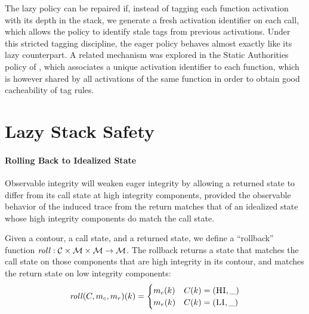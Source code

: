 \documentclass[acmsmall,review,anonymous]{acmart}\settopmatter{printfolios=true,printccs=false,printacmref=false}
\begin{document}
The lazy policy can be repaired if, instead of tagging each function activation
with its depth in the stack, we generate a fresh activation identifier on each
call, which allows the policy to identify stale tags from previous activations.
Under this stricted tagging discipline, the eager policy behaves almost exactly
like its lazy counterpart. A related mechanism was explored in the Static
Authorities policy of \citet{DBLP:conf/sp/RoesslerD18}, which associates a
unique activation identifier to each function, which is however shared by all
activations of the same function in order to obtain good cacheability of tag
rules.





\section{Lazy Stack Safety}
\label{sec:lazy}



    \paragraph{Rolling Back to Idealized State}
      Observable integrity will weaken eager integrity by allowing a returned
      state to differ from its call state at high integrity components,
      provided the observable behavior of the induced trace from the return
      matches that of an idealized state whose high integrity components do
      match the call state.

      Given a contour, a call state, and a returned state, we define a
      ``rollback'' function \(\mathit{roll} : {\mathcal C} \times {\mathcal M} \times
      {\mathcal M} \rightarrow {\mathcal M}\). The rollback returns a state that matches
      the call state on those components that are high integrity in its
      contour, and matches the return state on low integrity components:
      \[\mathit{roll}(C,m_c,m_r)(k) =
      \begin{cases}
        m_c(k) & C(k) = (\textsc{HI},\_) \\
        m_r(k) & C(k) = (\textsc{LI},\_) \\
      \end{cases}\]
\end{document}
